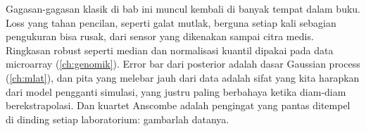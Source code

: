 Gagasan-gagasan klasik di bab ini muncul kembali di banyak tempat dalam buku. Loss yang tahan pencilan, seperti galat mutlak,
berguna setiap kali sebagian pengukuran bisa rusak, dari sensor yang dikenakan sampai citra medis. Ringkasan robust seperti median dan normalisasi kuantil dipakai pada data microarray
(\cref{ch:genomik}). Error bar dari posterior adalah dasar Gaussian process (\cref{ch:mlat}), dan pita yang melebar jauh dari data
adalah sifat yang kita harapkan dari model pengganti simulasi, yang justru paling berbahaya ketika diam-diam berekstrapolasi.
Dan kuartet Anscombe adalah pengingat yang pantas ditempel di dinding setiap laboratorium: gambarlah datanya.


